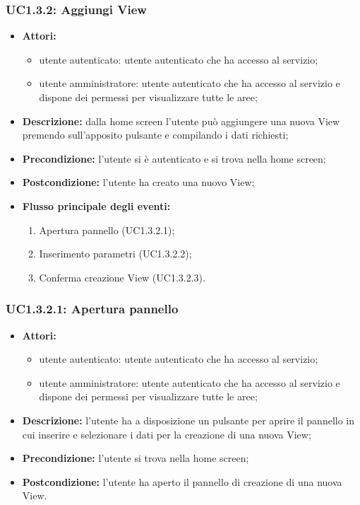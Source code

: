 \subsubsection{UC1.3.2: Aggiungi View}

\begin{itemize}
    \item \textbf{Attori:}
    \begin{itemize}
    	\item utente autenticato: utente autenticato che ha accesso al servizio;
    	\item utente amministratore: utente autenticato che ha accesso al servizio e dispone dei permessi per visualizzare tutte le aree;
	\end{itemize}
    \item \textbf{Descrizione:} dalla home screen l'utente può aggiungere una nuova View premendo sull'apposito pulsante e compilando i dati richiesti;
    \item \textbf{Precondizione:} l'utente si è autenticato e si trova nella home screen;
    \item \textbf{Postcondizione:} l'utente ha creato una nuovo View;
	\item \textbf{Flusso principale degli eventi:}
    \begin{enumerate}
        \item Apertura pannello (UC1.3.2.1);
        \item Inserimento parametri (UC1.3.2.2);
        \item Conferma creazione View (UC1.3.2.3).
    \end{enumerate}
\end{itemize}

\subsubsection{UC1.3.2.1: Apertura pannello}

\begin{itemize}
    \item \textbf{Attori:}
    \begin{itemize}
    	\item utente autenticato: utente autenticato che ha accesso al servizio;
    	\item utente amministratore: utente autenticato che ha accesso al servizio e dispone dei permessi per visualizzare tutte le aree;
	\end{itemize}
    \item \textbf{Descrizione:} l'utente ha a disposizione un pulsante per aprire il pannello in cui inserire e selezionare i dati per la creazione di una nuova View;
    \item \textbf{Precondizione:} l'utente si trova nella home screen;
    \item \textbf{Postcondizione:} l'utente ha aperto il pannello di creazione di una nuova View.
\end{itemize}

